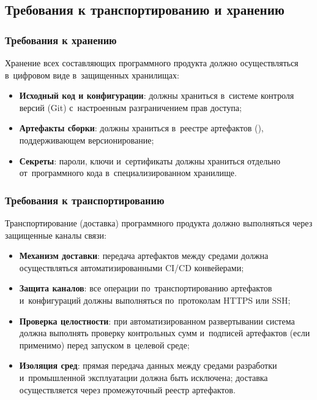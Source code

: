 \documentclass[12pt,a4paper]{extarticle}
\begin{document}
\subsection{Требования к транспортированию и хранению}

\subsubsection{Требования к хранению}

\begin{hseExample}
Хранение всех составляющих программного продукта должно осуществляться в~цифровом виде в~защищенных хранилищах:
\begin{itemize}[nosep, leftmargin=1.25cm]
    \item \textbf{Исходный код и конфигурации}: должны храниться в~системе контроля версий (Git) с~настроенным разграничением прав доступа;
    \item \textbf{Артефакты сборки}: должны храниться в~реестре артефактов (), поддерживающем версионирование;
    \item \textbf{Секреты}: пароли, ключи и~сертификаты должны храниться отдельно от~программного кода в~специализированном хранилище.
\end{itemize}
\end{hseExample}

\subsubsection{Требования к транспортированию}

\begin{hseExample}
Транспортирование (доставка) программного продукта должно выполняться через защищенные каналы связи:
\begin{itemize}[nosep, leftmargin=1.25cm]
    \item \textbf{Механизм доставки}: передача артефактов между средами должна осуществляться автоматизированными CI/CD конвейерами;
    \item \textbf{Защита каналов}: все операции по~транспортированию артефактов и~конфигураций должны выполняться по~протоколам HTTPS или SSH;
    \item \textbf{Проверка целостности}: при автоматизированном развертывании система должна выполнять проверку контрольных сумм и~подписей артефактов (если применимо) перед запуском в~целевой среде;
    \item \textbf{Изоляция сред}: прямая передача данных между средами разработки и~промышленной эксплуатации должна быть исключена; доставка осуществляется через промежуточный реестр артефактов.
\end{itemize}
\end{hseExample}
\end{document}

